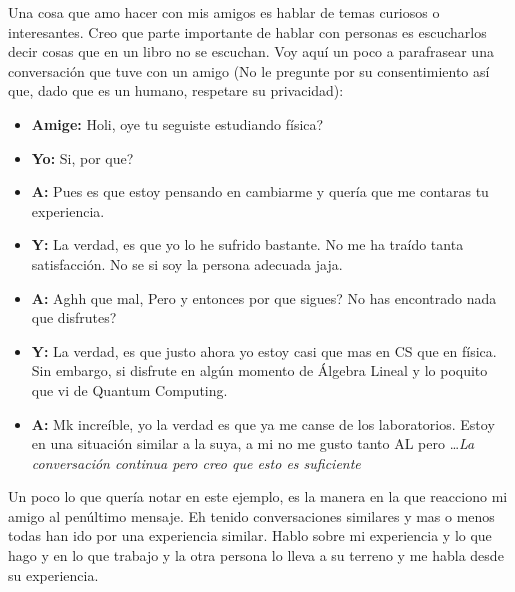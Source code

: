 \documentclass[12pt]{exam}
\begin{document}
Una cosa que amo hacer con mis amigos es hablar de temas curiosos o interesantes. Creo que parte importante de hablar con personas es escucharlos decir cosas que en un libro no se escuchan. Voy aquí un poco a parafrasear una conversación que tuve con un amigo (No le pregunte por su consentimiento así que, dado que es un humano, respetare su privacidad):

\begin{itemize}
  \item \textbf{Amige:} Holi, oye tu seguiste estudiando física?
  \item \textbf{Yo:} Si, por que?
  \item \textbf{A:} Pues es que estoy pensando en cambiarme y quería que me contaras tu experiencia. 
  \item \textbf{Y:} La verdad, es que yo lo he sufrido bastante. No me ha traído tanta satisfacción. No se si soy la persona adecuada jaja.
  \item \textbf{A:} Aghh que mal, Pero y entonces por que sigues? No has encontrado nada que disfrutes?
  \item \textbf{Y:} La verdad, es que justo ahora yo estoy casi que mas en CS que en física. Sin embargo, si disfrute en algún momento de Álgebra Lineal y lo poquito que vi de Quantum Computing.
  \item \textbf{A:} Mk increíble, yo la verdad es que ya me canse de los laboratorios. Estoy en una situación similar a la suya, a mi no me gusto tanto AL pero \ldots \textit{La conversación continua pero creo que esto es suficiente}
\end{itemize}

Un poco lo que quería notar en este ejemplo, es la manera en la que reacciono mi amigo al penúltimo mensaje. Eh tenido conversaciones similares y mas o menos todas han ido por una experiencia similar. Hablo sobre mi experiencia y lo que hago y en lo que trabajo y la otra persona lo lleva a su terreno y me habla desde su experiencia. 
\end{document}

